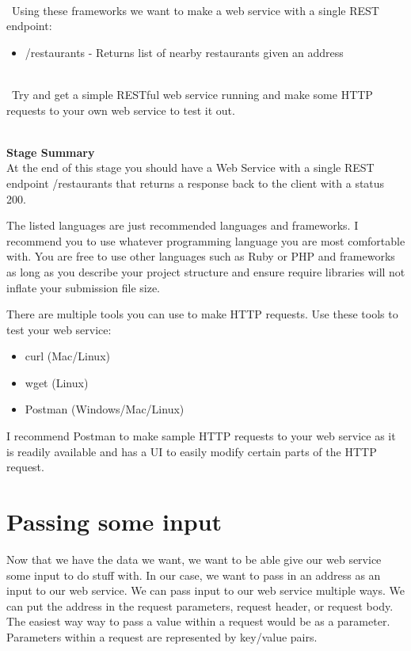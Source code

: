 \documentclass{article}
\begin{document}
\-\\\ Using these frameworks we want to make a web service with a single REST endpoint:
\begin{itemize}
\item /restaurants - Returns list of nearby restaurants given an address
\end{itemize}

\-\\\ Try and get a simple RESTful web service running and make some HTTP requests to your own web service to test it out. 

\-\ \\
\textbf{Stage Summary}\\
At the end of this stage you should have a Web Service with a single REST endpoint /restaurants that returns a response back to the client with a status 200.

\begin{info}[Note:]
The listed languages are just recommended languages and frameworks. I recommend you to use whatever programming language you are most comfortable with. You are free to use other languages such as Ruby or PHP and frameworks as long as you describe your project structure and ensure require libraries will not inflate your submission file size.
\end{info}

\begin{info}
There are multiple tools you can use to make HTTP requests. Use these tools to test your web service:
\begin{itemize}
\item curl (Mac/Linux)
\item wget (Linux)
\item Postman (Windows/Mac/Linux)
\end{itemize}
I recommend Postman to make sample HTTP requests to your web service as it is readily available and has a UI to easily modify certain parts of the HTTP request. 
\end{info}



\section{Passing some input}
Now that we have the data we want, we want to be able give our web service some input to do stuff with. In our case, we want to pass in an address as an input to our web service. We can pass input to our web service multiple ways. We can put the address in the request parameters, request header, or request body. The easiest way way to pass a value within a request would be as a parameter. Parameters within a request are represented by key/value pairs.
\end{document}

